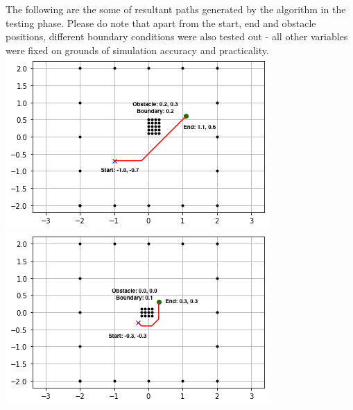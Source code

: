 \documentclass[a4paper]{article}
\begin{document}
The following are the some of resultant paths generated by the algorithm in the testing phase. Please do note that apart from the start, end and obstacle positions, different boundary conditions were also tested out - all other variables were fixed on grounds of simulation accuracy and practicality. \\

\includegraphics[scale=0.62]{images/img1.png}
\includegraphics[scale=0.62]{images/img2.png}\\
\end{document}
